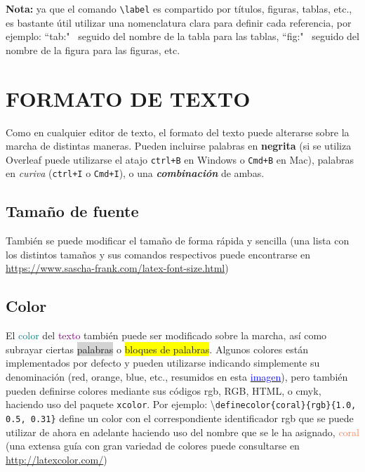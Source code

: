 \documentclass[a4paper, 11pt, spanish, twoside]{article}
\begin{document}
\textbf{Nota:} ya que el comando \texttt{\textbackslash label} es compartido por títulos, figuras, tablas, etc., es bastante útil utilizar una nomenclatura clara para definir cada referencia, por ejemplo: ``tab:" \ seguido del nombre de la tabla para las tablas, ``fig:" \ seguido del nombre de la figura para las figuras, etc.




\newpage
\section{FORMATO DE TEXTO} \label{sec:formato}

Como en cualquier editor de texto, el formato del texto puede alterarse sobre la marcha de distintas maneras. Pueden incluirse palabras en \textbf{negrita} (si se utiliza Overleaf puede utilizarse el atajo \texttt{ctrl+B} en Windows o \texttt{Cmd+B} en Mac), palabras en \textit{curiva} (\texttt{ctrl+I} o \texttt{Cmd+I}), o una \textit{\textbf{combinación}} de ambas.


\subsection{Tamaño de fuente}

También se puede modificar el {\huge tamaño} de forma {\footnotesize rápida} y {\Large sencilla} (una lista con los distintos tamaños y sus comandos respectivos puede encontrarse en \url{https://www.sascha-frank.com/latex-font-size.html})


\subsection{Color}


El \textcolor{teal}{color} del \textcolor{purple}{texto} también puede ser modificado sobre la marcha, así como subrayar ciertas \colorbox{lightgray}{palabras} o \colorbox{yellow}{bloques de palabras}. Algunos colores están implementados por defecto y pueden utilizarse indicando simplemente su denominación (red, orange, blue, etc., resumidos en esta \href{https://i.stack.imgur.com/tmoHS.png}{\textcolor{blue}{imagen}}), pero también pueden definirse colores mediante sus códigos rgb, RGB, HTML, o cmyk, haciendo uso del paquete \texttt{xcolor}. Por ejemplo: \textbackslash \texttt{definecolor\{coral\}\{rgb\}\{1.0, 0.5, 0.31\}} define un color con el correspondiente identificador rgb que se puede utilizar de ahora en adelante haciendo uso del nombre que se le ha asignado, \textcolor{coral}{coral} (una extensa guía con gran variedad de colores puede consultarse en \url{http://latexcolor.com/})
\end{document}
